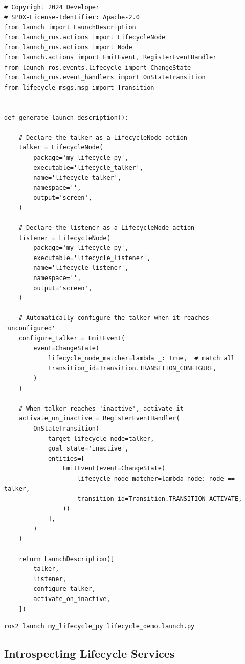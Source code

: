 \documentclass[11pt,a4paper]{csarticle}
\begin{document}
\begin{lstlisting}[style=python,caption={launch/lifecycle\_demo.launch.py}]
# Copyright 2024 Developer
# SPDX-License-Identifier: Apache-2.0
from launch import LaunchDescription
from launch_ros.actions import LifecycleNode
from launch_ros.actions import Node
from launch.actions import EmitEvent, RegisterEventHandler
from launch_ros.events.lifecycle import ChangeState
from launch_ros.event_handlers import OnStateTransition
from lifecycle_msgs.msg import Transition


def generate_launch_description():

    # Declare the talker as a LifecycleNode action
    talker = LifecycleNode(
        package='my_lifecycle_py',
        executable='lifecycle_talker',
        name='lifecycle_talker',
        namespace='',
        output='screen',
    )

    # Declare the listener as a LifecycleNode action
    listener = LifecycleNode(
        package='my_lifecycle_py',
        executable='lifecycle_listener',
        name='lifecycle_listener',
        namespace='',
        output='screen',
    )

    # Automatically configure the talker when it reaches 'unconfigured'
    configure_talker = EmitEvent(
        event=ChangeState(
            lifecycle_node_matcher=lambda _: True,  # match all
            transition_id=Transition.TRANSITION_CONFIGURE,
        )
    )

    # When talker reaches 'inactive', activate it
    activate_on_inactive = RegisterEventHandler(
        OnStateTransition(
            target_lifecycle_node=talker,
            goal_state='inactive',
            entities=[
                EmitEvent(event=ChangeState(
                    lifecycle_node_matcher=lambda node: node == talker,
                    transition_id=Transition.TRANSITION_ACTIVATE,
                ))
            ],
        )
    )

    return LaunchDescription([
        talker,
        listener,
        configure_talker,
        activate_on_inactive,
    ])
\end{lstlisting}

\begin{lstlisting}[style=bash,caption={Running the launch file}]
ros2 launch my_lifecycle_py lifecycle_demo.launch.py
\end{lstlisting}

\subsection{Introspecting Lifecycle Services}
\end{document}

